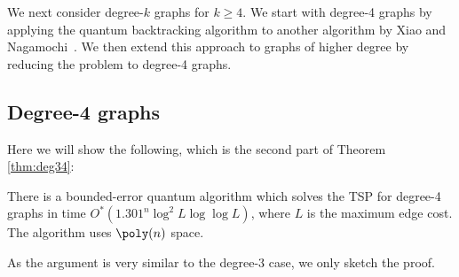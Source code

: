 We next consider degree-$k$ graphs for $k \ge 4$. We start with degree-4 graphs by applying the quantum backtracking algorithm to another algorithm by Xiao and Nagamochi~\cite{xiao2016degree4}. We then extend this approach to graphs of higher degree by reducing the problem to degree-4 graphs.

\subsection{Degree-4 graphs}

Here we will show the following, which is the second part of Theorem \ref{thm:deg34}:

\begin{theorem}
There is a bounded-error quantum algorithm which solves the TSP for degree-4 graphs in time $O^*(1.301^n\log^2 L \log \log L)$, where $L$ is the maximum edge cost. The algorithm uses $\poly(n)$ space.
\end{theorem}

As the argument is very similar to the degree-3 case, we only sketch the proof.

